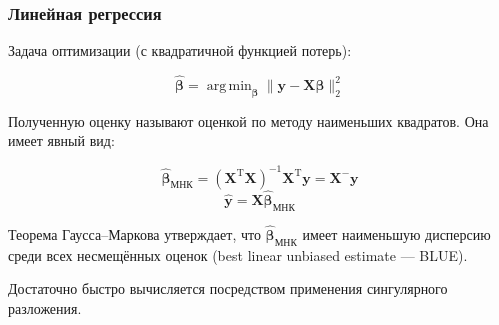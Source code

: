 \documentclass[ucs, notheorems, handout]{beamer}
\DeclareMathOperator*{\argmin}{arg\,min}
\newcommand{\betah}{\hat{\bm \beta}}
\newcommand{\betaa}{\bm{\beta}}
\begin{document}
\begin{frame}
	\frametitle{Линейная регрессия}
	
	Задача оптимизации (с квадратичной функцией потерь):
	
	$$\betah = \argmin_{\betaa}{\|\bm y - \bm X \betaa\|^2_2}$$
	
	Полученную оценку называют оценкой по методу наименьших квадратов. Она имеет явный вид:
	
 $$\betah_{\text{МНК}}=(\bm{X}^{\mathrm{T}}\bm{X})^{-1}\bm{X}^{\mathrm{T}} \bm y=\bm{X}^{-}\bm y$$ 
	$$\hat{\bm y}=\bm{X}\betah_{\text{МНК}}$$
	
	Теорема Гаусса--Маркова утверждает, что $\betah_{\text{МНК}}$ имеет наименьшую дисперсию среди всех несмещённых оценок (best linear unbiased estimate --- BLUE).
	
	
	Достаточно быстро вычисляется  посредством применения сингулярного разложения.
	
	
\end{frame}

\end{document}

